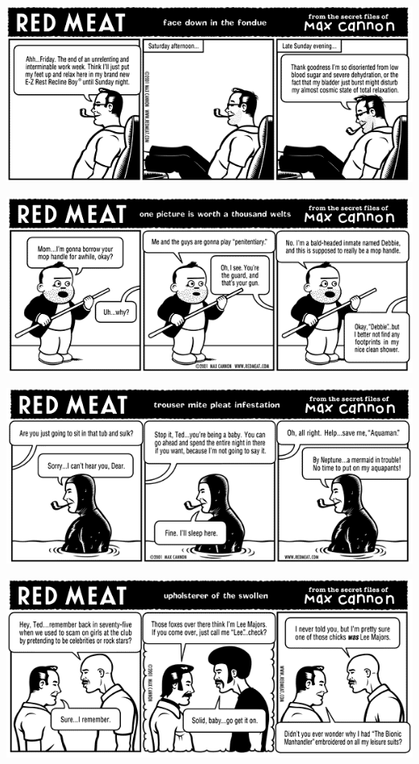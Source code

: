 \documentclass[a4paper,twoside,11pt]{article}
\begin{document}
\includegraphics[width=\textwidth]{redmeat_2001-08-07.png}



\includegraphics[width=\textwidth]{redmeat_2001-08-14.png}



\includegraphics[width=\textwidth]{redmeat_2001-08-21.png}



\includegraphics[width=\textwidth]{redmeat_2001-08-28.png}
\end{document}
